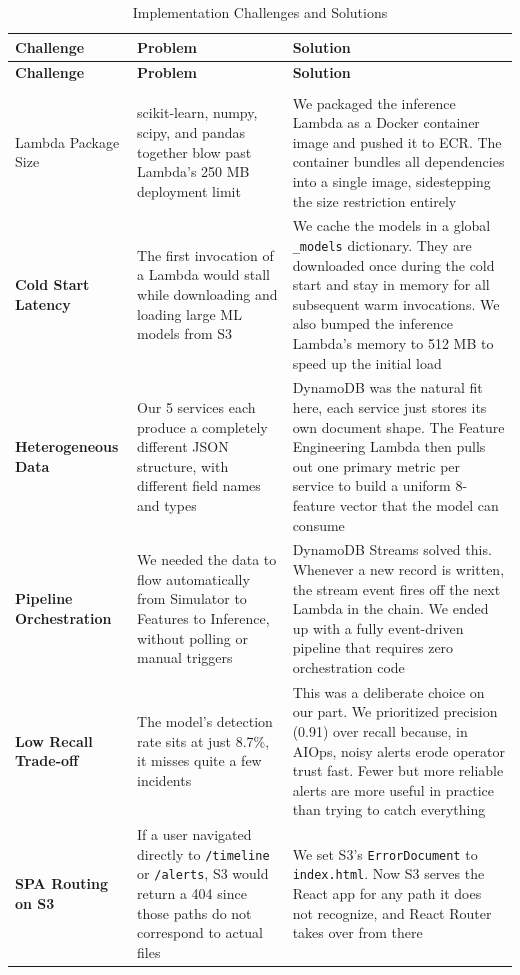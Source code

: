 \documentclass[11pt,a4paper]{article}
\begin{document}
\begin{xltabular}{\textwidth}{>{\bfseries}p{3.5cm}XX}
\toprule
\textbf{Challenge} & \textbf{Problem} & \textbf{Solution} \\
\midrule
\endfirsthead

\toprule
\textbf{Challenge} & \textbf{Problem} & \textbf{Solution} \\
\midrule
\endhead

\bottomrule
\caption{Implementation Challenges and Solutions} \\
\label{tab:challenges}
\endfoot

Lambda Package Size & scikit-learn, numpy, scipy, and pandas together blow past Lambda's 250 MB deployment limit & We packaged the inference Lambda as a Docker container image and pushed it to ECR. The container bundles all dependencies into a single image, sidestepping the size restriction entirely \\
\midrule
Cold Start Latency & The first invocation of a Lambda would stall while downloading and loading large ML models from S3 & We cache the models in a global \texttt{\_models} dictionary. They are downloaded once during the cold start and stay in memory for all subsequent warm invocations. We also bumped the inference Lambda's memory to 512 MB to speed up the initial load \\
\midrule
Heterogeneous Data & Our 5 services each produce a completely different JSON structure, with different field names and types & DynamoDB was the natural fit here, each service just stores its own document shape. The Feature Engineering Lambda then pulls out one primary metric per service to build a uniform 8-feature vector that the model can consume \\
\midrule
Pipeline Orchestration & We needed the data to flow automatically from Simulator to Features to Inference, without polling or manual triggers & DynamoDB Streams solved this. Whenever a new record is written, the stream event fires off the next Lambda in the chain. We ended up with a fully event-driven pipeline that requires zero orchestration code \\
\midrule
Low Recall Trade-off & The model's detection rate sits at just 8.7\%, it misses quite a few incidents & This was a deliberate choice on our part. We prioritized precision (0.91) over recall because, in AIOps, noisy alerts erode operator trust fast. Fewer but more reliable alerts are more useful in practice than trying to catch everything \\
\midrule
SPA Routing on S3 & If a user navigated directly to \texttt{/timeline} or \texttt{/alerts}, S3 would return a 404 since those paths do not correspond to actual files & We set S3's \texttt{ErrorDocument} to \texttt{index.html}. Now S3 serves the React app for any path it does not recognize, and React Router takes over from there \\

\end{xltabular}
\end{document}
